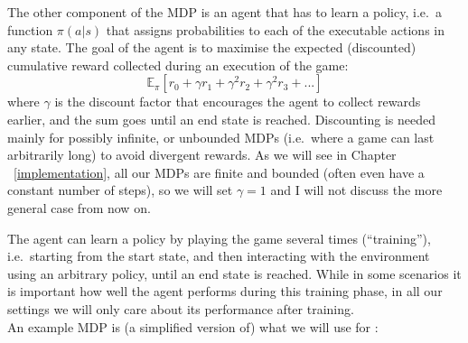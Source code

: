 The other component of the MDP is an agent that has to learn a policy, i.e.\ a function $\pi(a|s)$ that assigns probabilities to each of the executable actions in any state. The goal of the agent is to maximise the expected (discounted) cumulative reward collected during an execution of the game:
\begin{equation}\label{eq:cumReward}
\mathbb{E}_{\pi}[r_{0} + \gamma r_{1} + \gamma^2 r_{2} + \gamma^2 r_{3} + ...]
\end{equation}
where $\gamma$ is the discount factor that encourages the agent to collect rewards earlier, and the sum goes until an end state is reached. Discounting is needed mainly for possibly infinite, or unbounded MDPs (i.e.\ where a game can last arbitrarily long) to avoid divergent rewards. As we will see in Chapter ~\ref{implementation}, all our MDPs are finite and bounded (often even have a constant number of steps), so we will set $\gamma=1$ and I will not discuss the more general case from now on. 


The agent can learn a policy by playing the game several times (``training''), i.e.\ starting from the start state, and then interacting with the environment using an arbitrary policy, until an end state is reached. While in some scenarios it is important how well the agent performs during this training phase, in all our settings we will only care about its performance after training.\\

An example MDP is (a simplified version of) what we will use for \TwoThinning:

